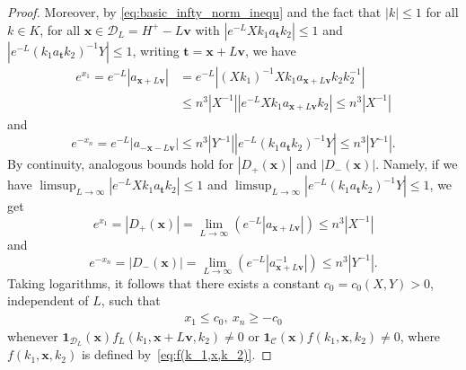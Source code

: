 \documentclass[10pt,a4paper]{amsart}
\newcommand{\x}{\mathbf{x}}
\begin{document}
\begin{proof}
      
      Moreover, by \eqref{eq:basic_infty_norm_inequ} and the fact that  $| k | \le 1$ for all $k \in K$,  for all $\x \in \mathcal{D}_{L}=H^{+}-L\mathbf{v}$ with $| e^{-L} X k_1 a_{\mathbf{t}} k_2 | \le 1$  and $|e^{-L} (k_1 a_{\mathbf{t}} k_2)^{-1} Y | \le 1$, writing $\mathbf{t}=\mathbf{x}+L\mathbf{v}$, we have 
      \begin{align*}
           e^{x_1} = 
      e^{-L}
      | a_{\mathbf{x} + L\mathbf{v}} | 
      &=
      e^{-L}| (X k_1)^{-1}X k_1 a_{\mathbf{x} + L\mathbf{v}} k_2 k_2^{-1} | \\
      &\le
      n^3 |  X^{-1} |  | e^{-L} X k_1 a_{\mathbf{x} + L\mathbf{v}} k_2  | \le n^3 |  X^{-1} |
      \end{align*}
      and 
      \[
      e^{-x_n} = 
      e^{-L} |a_{\mathbf{-x} - L\mathbf{v}} | 
      \le n^3
      | Y^{-1} |
      | e^{-L}(k_1 a_{\mathbf{t}} k_2)^{-1} Y  | \le  n^3
      | Y^{-1} |.
      \]
       By continuity, analogous bounds hold for $|D_+(\x)|$ and 
      $|D_-(\x)|$. Namely, if we have  $\limsup_{L \to \infty}| e^{-L} X k_1 a_{\mathbf{t}} k_2 | \le 1$  and $\limsup_{L \to \infty}|e^{-L} (k_1 a_{\mathbf{t}} k_2)^{-1} Y | \le 1$, we get 
      \[
      e^{x_1}=
      |D_+(\x)| = \lim_{L\to \infty} ( e^{-L} |a_{\mathbf{x}+  L\mathbf{v}}|) \le n^3|X^{-1}|
      \]
      and 
      \[
      e^{-x_n}=
       |D_-(\x)| = \lim_{L\to \infty} ( e^{-L} |a^{-1}_{\mathbf{x}+  L\mathbf{v}}|) \le n^3|Y^{-1}|.
      \]
    Taking logarithms, it follows that there exists a constant $c_0 = c_0(X,Y) > 0$, independent of $L$, such that 
    \begin{align} \label{eq:suppboundforf}
        x_1 \le c_0, \ x_n \ge - c_0 
    \end{align}
    whenever $\mathbf{1}_{\mathcal{D}_{L}}(\x)f_L(k_1,\mathbf x+L\mathbf{v},k_2)\neq0$ or
$\mathbf{1}_{\mathcal{C}}(\x)f(k_1,\mathbf x,k_2)\neq0$, where $f(k_1,\mathbf x,k_2)$ is defined by~\eqref{eq:f(k_1,x,k_2)}.



\end{proof}
\end{document}

